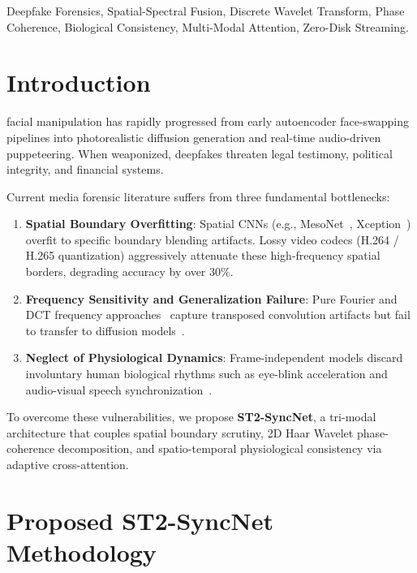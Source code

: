 \documentclass[journal]{IEEEtran}
\begin{document}
\begin{IEEEkeywords}
Deepfake Forensics, Spatial-Spectral Fusion, Discrete Wavelet Transform, Phase Coherence, Biological Consistency, Multi-Modal Attention, Zero-Disk Streaming.
\end{IEEEkeywords}

\section{Introduction}
 facial manipulation has rapidly progressed from early autoencoder face-swapping pipelines into photorealistic diffusion generation and real-time audio-driven puppeteering. When weaponized, deepfakes threaten legal testimony, political integrity, and financial systems.

Current media forensic literature suffers from three fundamental bottlenecks:
\begin{enumerate}
    \item \textbf{Spatial Boundary Overfitting}: Spatial CNNs (e.g., MesoNet~\cite{afchar2018mesonet}, Xception~\cite{rossler2019faceforensics}) overfit to specific boundary blending artifacts. Lossy video codecs (H.264 / H.265 quantization) aggressively attenuate these high-frequency spatial borders, degrading accuracy by over 30\%.
    \item \textbf{Frequency Sensitivity and Generalization Failure}: Pure Fourier and DCT frequency approaches~\cite{qian2020f3net, frank2020leveraging} capture transposed convolution artifacts but fail to transfer to diffusion models~\cite{zhu2023genimage, wang2023dire}.
    \item \textbf{Neglect of Physiological Dynamics}: Frame-independent models discard involuntary human biological rhythms such as eye-blink acceleration and audio-visual speech synchronization~\cite{haliassos2021lips, khalid2021fakeavceleb}.
\end{enumerate}

To overcome these vulnerabilities, we propose \textbf{ST2-SyncNet}, a tri-modal architecture that couples spatial boundary scrutiny, 2D Haar Wavelet phase-coherence decomposition, and spatio-temporal physiological consistency via adaptive cross-attention.

\section{Proposed ST2-SyncNet Methodology}
\end{document}
